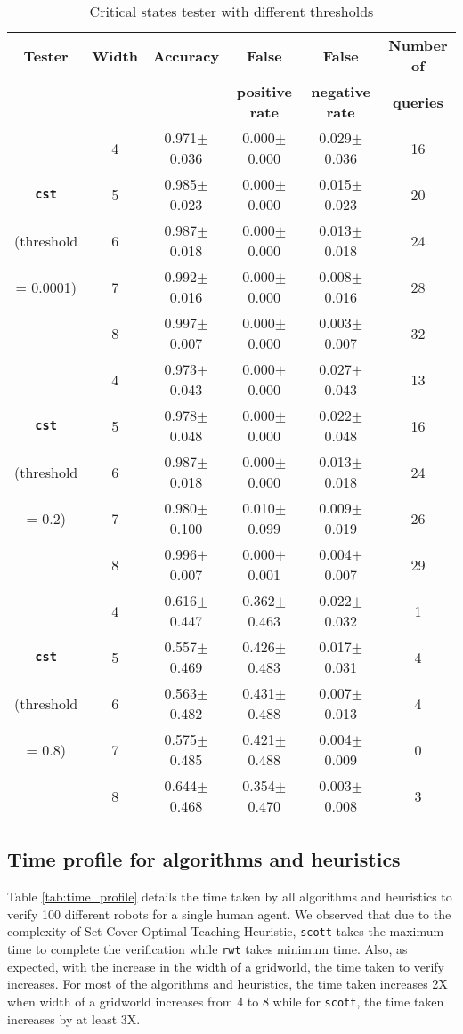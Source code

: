 \begin{table}[!ht]
    
    \caption{Critical states tester with different thresholds}
  \label{tab:cst_thresholds_appendix}
  \centering
  \begin{tabular}{cccccc}
  \\
    \toprule
    \textbf{Tester}& \textbf{Width}& \textbf{Accuracy} & \textbf{False} & \textbf{False} & \textbf{Number of} \\
    & & & \textbf{positive rate} & \textbf{negative rate} & \textbf{queries} \\
    \midrule
    & 4 & 0.971$\pm$0.036&	0.000$\pm$0.000&0.029$\pm$0.036&16\\
    \textbf{\texttt{cst}}& 5 & 0.985$\pm$0.023&0.000$\pm$0.000&0.015$\pm$0.023&20\\
    (threshold & 6 & 0.987$\pm$0.018&0.000$\pm$0.000&0.013$\pm$0.018&24\\
    = 0.0001)& 7 & 0.992$\pm$0.016&	0.000$\pm$0.000&0.008$\pm$0.016&28\\
    & 8 & 0.997$\pm$0.007&	0.000$\pm$0.000&0.003$\pm$0.007&32\\
    \midrule
    & 4 & 0.973$\pm$0.043&0.000$\pm$0.000&0.027$\pm$0.043&13\\
    \textbf{\texttt{cst}} & 5 & 0.978$\pm$0.048&0.000$\pm$0.000&0.022$\pm$0.048&16\\
    (threshold& 6 & 0.987$\pm$0.018&0.000$\pm$0.000&0.013$\pm$0.018&24\\
    = 0.2)& 7 & 0.980$\pm$0.100&0.010$\pm$0.099&0.009$\pm$0.019&26\\
    & 8 & 0.996$\pm$0.007&	0.000$\pm$0.001&0.004$\pm$0.007&29\\
    \midrule
    & 4 & 0.616$\pm$0.447&0.362$\pm$0.463&0.022$\pm$0.032&1\\
    \textbf{\texttt{cst}}& 5 & 0.557$\pm$0.469&0.426$\pm$0.483&0.017$\pm$0.031&4\\
    (threshold& 6 & 0.563$\pm$0.482&0.431$\pm$0.488&0.007$\pm$0.013&4\\
    = 0.8)& 7 & 0.575$\pm$0.485&0.421$\pm$0.488&0.004$\pm$0.009&0\\
    & 8 & 0.644$\pm$0.468&	0.354$\pm$0.470&0.003$\pm$0.008&3\\

\bottomrule
    \end{tabular}
\end{table}

\subsection{Time profile for algorithms and heuristics}
Table \ref{tab:time_profile} details the time taken by all algorithms and heuristics to verify 100 different robots for a single human agent. We observed that due to the complexity of Set Cover Optimal Teaching Heuristic, \texttt{scott} takes the maximum time to complete the verification while \texttt{rwt} takes minimum time. Also, as expected, with the increase in the width of a gridworld, the time taken to verify increases. For most of the algorithms and heuristics, the time taken increases 2X when width of a gridworld increases from 4 to 8 while for \texttt{scott}, the time taken increases by at least 3X.


